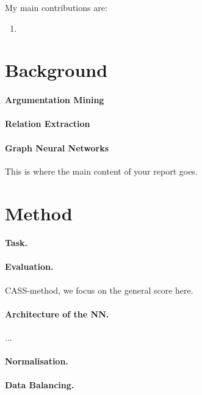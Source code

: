 \documentclass[11pt]{article}
\begin{document}
My main contributions are:
\begin{enumerate}
    \item 
\end{enumerate}

\section{Background}
\label{sect:background}

\paragraph{Argumentation Mining}

\paragraph{Relation Extraction}

\paragraph{Graph Neural Networks}

This is where the main content of your report goes.

\section{Method}

\paragraph{Task.}

\paragraph{Evaluation.} CASS-method, we focus on the general score here.

\paragraph{Architecture of the NN.}...

\paragraph{Normalisation.}

\paragraph{Data Balancing.}
\end{document}
